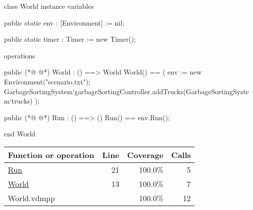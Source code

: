 \begin{vdmpp}[breaklines=true]
class World
instance variables  

public static
  env : [Environment] := nil;

public static 
  timer : Timer := new Timer();
   
operations

public 
(*@
\label{World:13}
@*)
  World : () ==> World
  World() ==
  (
    env := new Environment("scenario.txt");
    GarbageSortingSystem`garbageSortingController.addTrucks(GarbageSortingSystem`trucks)
  );
  
public 
(*@
\label{Run:21}
@*)
  Run : () ==> ()
  Run() ==
    env.Run();

end World
\end{vdmpp}
\bigskip
\begin{longtable}{|l|r|r|r|}
\hline
Function or operation & Line & Coverage & Calls \\
\hline
\hline
\hyperref[Run:21]{Run} & 21&100.0\% & 5 \\
\hline
\hyperref[World:13]{World} & 13&100.0\% & 7 \\
\hline
\hline
World.vdmpp & & 100.0\% & 12 \\
\hline
\end{longtable}

